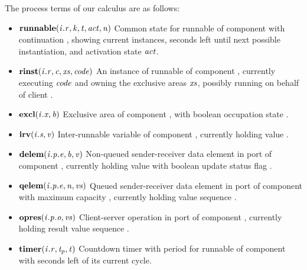 \documentclass[twocolumn]{article}
\begin{document}
The process terms of our calculus are as follows:
\begin{itemize}
\item $\Trunnable{\Tr{\V{R}}{\V{I}}}{\V{K}}{\V{T}}{\Act}{\V{N}}$  \newline
Common state for runnable  of component  with continuation , showing  current instances,  seconds left until next possible instantiation, and activation state $\Act$.
\item $\Trinst{\Tr{\V{R}}{\V{I}}}{\V{C}}{\Xs}{\Code}$ \newline
An instance of runnable  of component , currently executing $\Code$ and owning the exclusive areas $\Xs$, possibly running on behalf of client .
\item $\Texcl{\Tx{\V{X}}{\V{I}}}{\V{B}}$ \newline
Exclusive area  of component , with boolean occupation state .
\item $\Tirv{\Ts{\V{S}}{\V{I}}}{\V{V}}$ \newline
Inter-runnable variable  of component , currently holding value .
\item $\Tdelem{\Tep{\V{E}}{\V{P}}{\V{I}}}{\V{B}}{\V{V}}$ \newline
Non-queued sender-receiver data element  in port  of component , currently holding value  with boolean update status flag .
\item $\Tqelem{\Tep{\V{E}}{\V{P}}{\V{I}}}{\V{N}}{\Vs}$ \newline
Queued sender-receiver data element  in port  of component  with maximum capacity , currently holding value sequence \Vs.
\item $\Topres{\Top{\V{O}}{\V{P}}{\V{I}}}{\Vs}$ \newline
Client-server operation  in port  of component , currently holding result value sequence \Vs.
\item $\Ttimer{\Tr{\V{R}}{\V{I}}}{\V{T_p}}{\V{T}}$ \newline
Countdown timer with period  for runnable  of component  with  seconds left of its current cycle.
\end{itemize}
\end{document}
